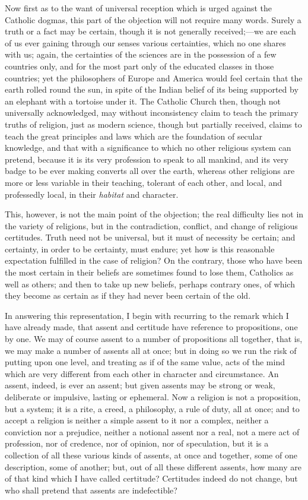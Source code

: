 Now first as to the want of universal reception which is urged
against the Catholic dogmas, this part of the objection will not
require many words. Surely a truth or a fact may be certain, though it
is not generally received;—we are each of us ever gaining through
our senses various certainties, which no one shares with us; again,
the certainties of the sciences are in the possession of a few
countries only, and for the most part only of the educated classes in
those countries; yet the philosophers of Europe and America would feel
certain that the earth rolled round the sun, in spite of the Indian
belief of its being supported by an elephant with a tortoise under it.
The Catholic Church then, though not universally acknowledged, may
without inconsistency claim to teach the primary truths of religion,
just as modern science, though but partially received, claims to teach
the great principles and laws which are the foundation of secular
knowledge, and that with a significance to which no other religious
system can pretend, because it is its very profession to speak to all
mankind, and its very badge to be ever making converts all over the
earth, whereas other religions are more or less variable in their
teaching, tolerant of each other, and local, and professedly local, in
their \emph{habitat} and character.

This, however, is not the main point of the objection; the real
difficulty lies not in the variety of religions, but in the
contradiction, conflict, and change of religious certitudes. Truth
need not be universal, but it must of necessity be certain; and
certainty, in order to be certainty, must endure; yet how is this
reasonable expectation fulfilled in the case of religion? On the
contrary, those who have been the most certain in their beliefs are
sometimes found to lose them, Catholics as well as others; and
then to take up new beliefs, perhaps contrary ones, of which they
become as certain as if they had never been certain of the old.

In answering this representation, I begin with recurring to the
remark which I have already made, that assent and certitude have
reference to propositions, one by one. We may of course assent to a
number of propositions all together, that is, we may make a number of
assents all at once; but in doing so we run the risk of putting upon
one level, and treating as if of the same value, acts of the mind
which are very different from each other in character and
circumstance. An assent, indeed, is ever an assent; but given assents
may be strong or weak, deliberate or impulsive, lasting or ephemeral.
Now a religion is not a proposition, but a system; it is a rite, a
creed, a philosophy, a rule of duty, all at once; and to accept a
religion is neither a simple assent to it nor a complex, neither a
conviction nor a prejudice, neither a notional assent nor a real, not
a mere act of profession, nor of credence, nor of opinion, nor of
speculation, but it is a collection of all these various kinds of
assents, at once and together, some of one description, some of
another; but, out of all these different assents, how many are of that
kind which I have called certitude? Certitudes indeed do not change,
but who shall pretend that assents are indefectible?

